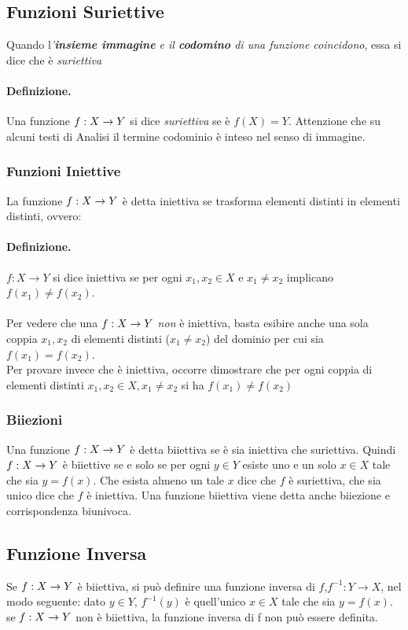 \documentclass[12pt, a4paper, openany]{book}
\begin{document}
\subsection{Funzioni Suriettive}
Quando l\emph{'\textbf{insieme immagine} e il \textbf{codomino} di una funzione coincidono}, essa si dice che è \emph{suriettiva}
\paragraph{Definizione. } Una funzione $f: X \rightarrow Y$ si dice \emph{suriettiva} se è $f(X) = Y$.
Attenzione che su alcuni testi di Analisi il termine codominio è inteso nel senso di immagine.

\subsubsection{Funzioni Iniettive}
La funzione $f: X \rightarrow Y$ è detta iniettiva se trasforma elementi distinti in elementi distinti, ovvero:
\paragraph{Definizione. } $f: X \rightarrow Y$ si dice iniettiva se per ogni $x_1, x_2 \in X$ e $x_1 \neq x_2$ implicano $f(x_1) \neq f(x_2)$.
\paragraph{}Per vedere che una $f: X \rightarrow Y$ \emph{non} è iniettiva, basta esibire anche una sola coppia $x_1, x_2$ di elementi distinti ($x_1 \neq x_2$) del dominio per cui sia $f(x_1) = f(x_2)$.
\\Per provare invece che è iniettiva, occorre dimostrare che per ogni coppia di elementi distinti $x_1, x_2 \in X, x_1 \neq x_2$ si ha $f(x_1) \neq f(x_2)$

\subsubsection{Biiezioni}
Una funzione $f: X \rightarrow Y$ è detta biiettiva se è sia iniettiva che suriettiva.
Quindi $f: X \rightarrow Y$ è biiettive se e solo se per ogni $y \in Y$ esiste uno e un solo $x \in X$ tale che sia $y = f(x)$.
Che esista almeno un tale $x$ dice che $f$ è suriettiva, che sia unico dice che $f$ è iniettiva.
Una funzione biiettiva viene detta anche biiezione e corrispondenza biunivoca. 

\subsection{Funzione Inversa}
Se $f: X \rightarrow Y$ è biiettiva, si può definire una funzione inversa di $f$,$f^{-1} : Y \rightarrow X$, nel modo seguente:
dato $y \in Y$, $f^{-1}(y)$ è quell'unico $x \in X$ tale che sia $y = f(x)$.
se $f: X \rightarrow Y$ non è biiettiva, la funzione inversa di f non può essere definita.
\end{document}
